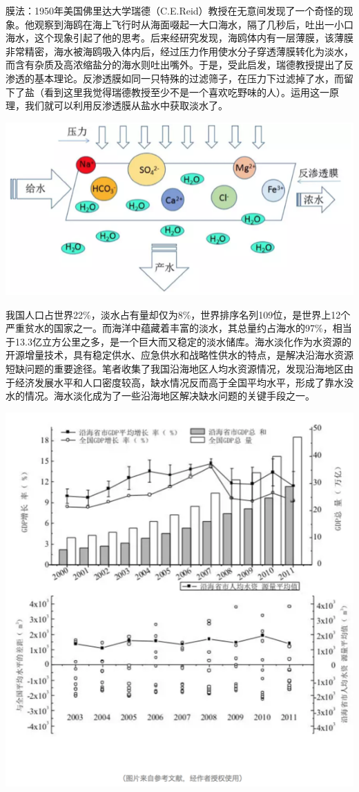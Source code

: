 \documentclass[]{book}
\begin{document}
膜法：1950年美国佛里达大学瑞德（C.E.Reid）教授在无意间发现了一个奇怪的现象。他观察到海鸥在海上飞行时从海面啜起一大口海水，隔了几秒后，吐出一小口海水，这个现象引起了他的思考。后来经研究发现，海鸥体内有一层薄膜，该薄膜非常精密，海水被海鸥吸入体内后，经过压力作用使水分子穿透薄膜转化为淡水，而含有杂质及高浓缩盐分的海水则吐出嘴外。于是，受此启发，瑞德教授提出了反渗透的基本理论。反渗透膜如同一只特殊的过滤筛子，在压力下过滤掉了水，而留下了盐（看到这里我觉得瑞德教授至少不是一个喜欢吃野味的人）。运用这一原理，我们就可以利用反渗透膜从盐水中获取淡水了。

\includegraphics[width=8.33in]{images/seawater2}

我国人口占世界22\%，淡水占有量却仅为8\%，世界排序名列109位，是世界上12个严重贫水的国家之一。而海洋中蕴藏着丰富的淡水，其总量约占海水的97\%，相当于13.3亿立方公里之多，是一个巨大而又稳定的淡水储库。海水淡化作为水资源的开源增量技术，具有稳定供水、应急供水和战略性供水的特点，是解决沿海水资源短缺问题的重要途径。笔者收集了我国沿海地区人均水资源情况，发现沿海地区由于经济发展水平和人口密度较高，缺水情况反而高于全国平均水平，形成了靠水没水的情况。海水淡化成为了一些沿海地区解决缺水问题的关键手段之一。

\includegraphics[width=7.76in]{images/seawater3}
\end{document}

